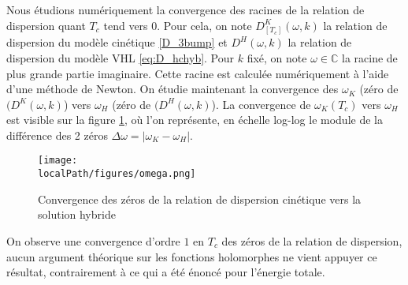 Nous \'etudions num\'eriquement la convergence des racines de la relation de dispersion quant $T_c$ tend vers $0$. 
Pour cela, on note $D^K_{[T_c]}(\omega,k)$ la relation de dispersion du mod\`ele cin\'etique \eqref{D_3bump} 
et $D^H(\omega,k)$ la relation de dispersion du mod\`ele VHL \eqref{eq:D_hchyb}.  
Pour $k$ fix\'e, on note $\omega\in\mathbb{C}$ la racine de plus grande partie imaginaire. 
Cette racine est calcul\'ee num\'eriquement \`a l'aide d'une m\'ethode de Newton. On étudie maintenant la convergence  
des $\omega_K$ (zéro de $(D^K(\omega,k)$) vers $\omega_H$ (zéro de $(D^H(\omega,k)$). La convergence de $\omega_K(T_c)$ vers $\omega_H$ est visible sur la figure \ref{fig:omega}, où l'on représente, en échelle log-log le module de la différence des 2 zéros $\Delta \omega = |\omega_K-\omega_H|$.
\begin{figure}[h!]
  \centering
  \texttt{[image: \\localPath/figures/omega.png]}
  \caption{Convergence des zéros de la relation de dispersion cinétique vers la solution hybride}
  \label{fig:omega}
\end{figure}
On observe une convergence d'ordre $1$ en $T_c$ des zéros de la relation de dispersion, aucun argument théorique sur les fonctions holomorphes ne vient appuyer ce résultat, contrairement à ce qui a été énoncé pour l'énergie totale.

